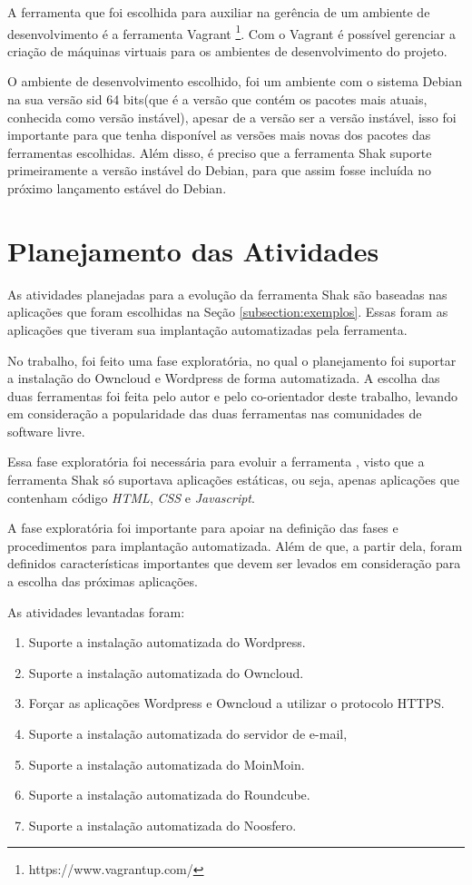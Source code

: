 A ferramenta que foi escolhida para auxiliar na gerência de um ambiente de desenvolvimento é
a ferramenta Vagrant \footnote{https://www.vagrantup.com/}. Com o Vagrant é 
possível gerenciar a criação de máquinas
virtuais para os ambientes de desenvolvimento do projeto.

O ambiente de desenvolvimento escolhido, foi um ambiente com o sistema Debian na sua versão
sid 64 bits(que é a versão que contém os pacotes mais atuais, conhecida como versão instável),
apesar de a versão ser a versão instável, isso foi importante para que tenha disponível 
as versões mais novas dos pacotes das ferramentas escolhidas. Além disso, é preciso que a ferramenta Shak suporte primeiramente a versão instável do Debian, para que assim 
fosse incluída no próximo lançamento estável do Debian.

\section{Planejamento das Atividades}

As atividades planejadas para a evolução da ferramenta Shak são baseadas nas 
aplicações que foram escolhidas na Seção
\ref{subsection:exemplos}. Essas foram as aplicações que tiveram
sua implantação automatizadas pela ferramenta. 

No trabalho, foi feito uma fase exploratória, no qual o planejamento foi
suportar a instalação do Owncloud e Wordpress de forma 
automatizada. A escolha das duas ferramentas foi feita pelo autor e pelo co-orientador
deste trabalho, levando em consideração a popularidade das duas ferramentas nas 
comunidades de software livre. 

Essa fase exploratória foi necessária para evoluir a ferramenta
, visto que a ferramenta Shak só suportava aplicações estáticas, ou seja, apenas 
aplicações que contenham 
código \textit{HTML}, \textit{CSS} e \textit{Javascript}. 

A fase exploratória foi importante para apoiar na definição das fases e 
procedimentos para implantação
automatizada. Além de que, a partir dela, foram definidos características importantes 
que devem ser levados em consideração para a escolha das próximas aplicações.

As atividades levantadas foram:

 \begin{enumerate}
   \item  Suporte a instalação automatizada do Wordpress.
   \item  Suporte a instalação automatizada do Owncloud.
   \item  Forçar as aplicações Wordpress e Owncloud a
   utilizar o protocolo HTTPS.
   \item  Suporte a instalação automatizada do servidor de e-mail,
   \item  Suporte a instalação automatizada do MoinMoin.
   \item  Suporte a instalação automatizada do Roundcube.
   \item  Suporte a instalação automatizada do Noosfero.
 \end{enumerate}

